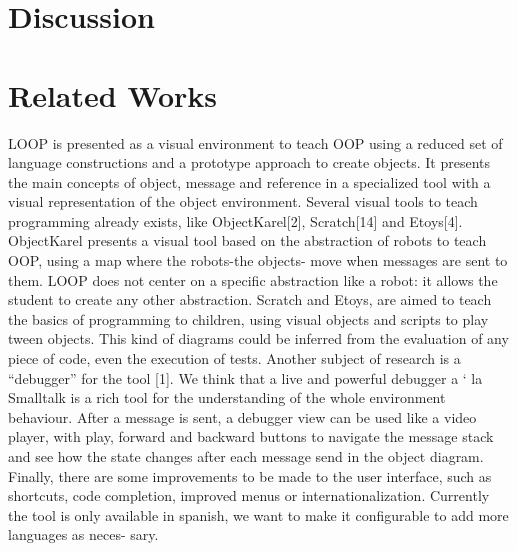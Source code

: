 \documentclass{article}
\begin{document}



\section{Discussion}
\label{sec:discussion}




\section{Related Works}
\label{sec:related}

LOOP is presented as a visual environment to teach OOP using
a reduced set of language constructions and a prototype approach
to create objects. It presents the main concepts of object, message
and reference in a specialized tool with a visual representation of
the object environment. Several visual tools to teach programming
already exists, like ObjectKarel[2], Scratch[14] and Etoys[4].
ObjectKarel presents a visual tool based on the abstraction of
robots to teach OOP, using a map where the robots-the objects-
move when messages are sent to them. LOOP does not center on a
specific abstraction like a robot: it allows the student to create any
other abstraction. Scratch and Etoys, are aimed to teach the basics
of programming to children, using visual objects and scripts to play
tween objects. This kind of diagrams could be inferred from the
evaluation of any piece of code, even the execution of tests.
Another subject of research is a “debugger” for the tool [1]. We
think that a live and powerful debugger a ` la Smalltalk is a rich tool
for the understanding of the whole environment behaviour. After a
message is sent, a debugger view can be used like a video player,
with play, forward and backward buttons to navigate the message
stack and see how the state changes after each message send in the
object diagram.
Finally, there are some improvements to be made to the user
interface, such as shortcuts, code completion, improved menus or
internationalization. Currently the tool is only available in spanish,
we want to make it configurable to add more languages as neces-
sary.
\end{document}
